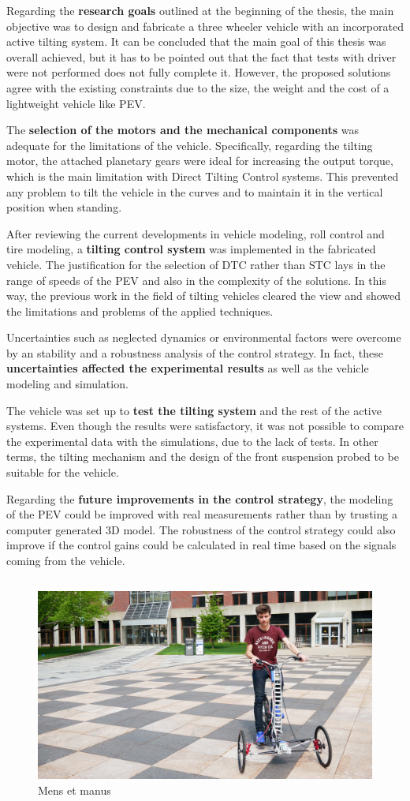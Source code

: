 Regarding the \textbf{research goals} outlined at the beginning of the thesis, the main objective was to design and fabricate a three wheeler vehicle with an incorporated active tilting system. It can be concluded that the main goal of this thesis was overall achieved, but it has to be pointed out that the fact that tests with driver were not performed does not fully complete it. However, the proposed solutions agree with the existing constraints due to the size, the weight and the cost of a lightweight vehicle like PEV.

The \textbf{selection of the motors and the mechanical components} was adequate for the limitations of the vehicle. Specifically, regarding the tilting motor, the attached planetary gears were ideal for increasing the output torque, which is the main limitation with Direct Tilting Control systems. This prevented any problem to tilt the vehicle in the curves and to maintain it in the vertical position when standing.


After reviewing the current developments in vehicle modeling, roll control and tire modeling, a \textbf{tilting control system} was implemented in the fabricated vehicle. The justification for the selection of DTC rather than STC lays in the range of speeds of the PEV and also in the complexity of the solutions. In this way, the previous work in the field of tilting vehicles cleared the view and showed the limitations and problems of the applied techniques.

Uncertainties such as neglected dynamics or environmental factors were overcome by an stability and a robustness analysis of the control strategy. In fact, these \textbf{uncertainties affected the experimental results} as well as the vehicle modeling and simulation. 

The vehicle was set up to \textbf{test the tilting system} and the rest of the active systems. Even though the results were satisfactory, it was not possible to compare the experimental data with the simulations, due to the lack of tests. In other terms, the tilting mechanism and the design of the front suspension probed to be suitable for the vehicle.

Regarding the \textbf{future improvements in the control strategy}, the modeling of the PEV could be improved with real measurements rather than by trusting a computer generated 3D model. The robustness of the control strategy could also improve if the control gains could be calculated in real time based on the signals coming from the vehicle.

\newpage
\[\]
\begin{figure}[!b]
	\includegraphics[width=1\linewidth]{figs/06/test_3}
	\caption{Mens et manus}
\end{figure}
